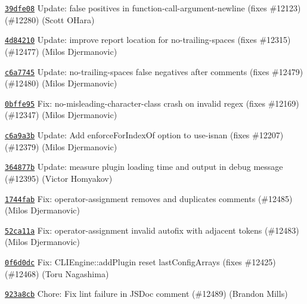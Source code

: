 \begin{DoxyItemize}
\item \href{https://github.com/eslint/eslint/commit/39dfe0880fa934e287e8ea1f7b56d5cba8d43765}{\texttt{ {\ttfamily 39dfe08}}} Update\+: false positives in function-\/call-\/argument-\/newline (fixes \#12123) (\#12280) (Scott O\textquotesingle{}Hara)
\item \href{https://github.com/eslint/eslint/commit/4d842105c9c82026be668d7425213138903d4d41}{\texttt{ {\ttfamily 4d84210}}} Update\+: improve report location for no-\/trailing-\/spaces (fixes \#12315) (\#12477) (Milos Djermanovic)
\item \href{https://github.com/eslint/eslint/commit/c6a7745a1371a85932bfae5fec039d1b6fcfc128}{\texttt{ {\ttfamily c6a7745}}} Update\+: no-\/trailing-\/spaces false negatives after comments (fixes \#12479) (\#12480) (Milos Djermanovic)
\item \href{https://github.com/eslint/eslint/commit/0bffe953d2752dd2d3045f2f8771c96b6cee8fc4}{\texttt{ {\ttfamily 0bffe95}}} Fix\+: no-\/misleading-\/character-\/class crash on invalid regex (fixes \#12169) (\#12347) (Milos Djermanovic)
\item \href{https://github.com/eslint/eslint/commit/c6a9a3bc58b69dbf9be9cd09b0283c081ca211e7}{\texttt{ {\ttfamily c6a9a3b}}} Update\+: Add enforce\+For\+Index\+Of option to use-\/isnan (fixes \#12207) (\#12379) (Milos Djermanovic)
\item \href{https://github.com/eslint/eslint/commit/364877b2504e8f7ece04770b93d517e2f27458d0}{\texttt{ {\ttfamily 364877b}}} Update\+: measure plugin loading time and output in debug message (\#12395) (Victor Homyakov)
\item \href{https://github.com/eslint/eslint/commit/1744faba3c93c869f7dbbf0a704d32e2692d6856}{\texttt{ {\ttfamily 1744fab}}} Fix\+: operator-\/assignment removes and duplicates comments (\#12485) (Milos Djermanovic)
\item \href{https://github.com/eslint/eslint/commit/52ca11a66ab6c2fb5a71d8b9869482f14f98cb9d}{\texttt{ {\ttfamily 52ca11a}}} Fix\+: operator-\/assignment invalid autofix with adjacent tokens (\#12483) (Milos Djermanovic)
\item \href{https://github.com/eslint/eslint/commit/0f6d0dcdf5adc30079a7379bbf605a4ef3887a85}{\texttt{ {\ttfamily 0f6d0dc}}} Fix\+: CLIEngine\+::add\+Plugin reset last\+Config\+Arrays (fixes \#12425) (\#12468) (Toru Nagashima)
\item \href{https://github.com/eslint/eslint/commit/923a8cb752b8dee1e622c5fd36f3f53288e30602}{\texttt{ {\ttfamily 923a8cb}}} Chore\+: Fix lint failure in JSDoc comment (\#12489) (Brandon Mills)

\end{DoxyItemize}
